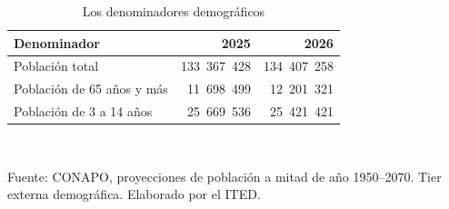 \begin{table}[htbp]
\centering
\scriptsize
\caption{Los denominadores demográficos}
\label{cua:C14_2}
\begin{tabular}{p{7.0cm}rr}
\toprule
\textbf{Denominador} & \textbf{2025} & \textbf{2026} \\
\midrule
Población total & 133 367 428 & 134 407 258 \\
Población de 65 años y más & 11 698 499 & 12 201 321 \\
Población de 3 a 14 años & 25 669 536 & 25 421 421 \\
\bottomrule
\end{tabular}
\\[2pt]\begin{minipage}{0.92\textwidth}\scriptsize Fuente: CONAPO, proyecciones de población a mitad de año 1950--2070. Tier externa demográfica. Elaborado por el ITED.\end{minipage}
\end{table}
